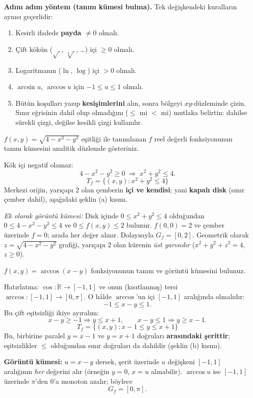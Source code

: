 \textbf{Adım adım yöntem (tanım kümesi bulma).} Tek değişkendeki kuralların aynısı geçerlidir:
\begin{enumerate}
  \item Kesirli ifadede \textbf{payda $\neq 0$} olmalı.
  \item Çift kökün ($\sqrt{\ }$, $\sqrt[4]{\ }$, \dots) içi \textbf{$\ge 0$} olmalı.
  \item Logaritmanın ($\ln$, $\log$) içi \textbf{$>0$} olmalı.
  \item $\arcsin u$, $\arccos u$ için \textbf{$-1\le u\le 1$} olmalı.
  \item Bütün koşulları yazıp \textbf{kesişimlerini} alın, sonra bölgeyi $xy$-düzleminde çizin. Sınır eğrisinin dahil olup
        olmadığını ($\le$ mi $<$ mi) mutlaka belirtin: dahilse sürekli çizgi, değilse kesikli çizgi kullanılır.
\end{enumerate}

\begin{soru}
$f(x,y)=\sqrt{4-x^2-y^2}$ eşitliği ile tanımlanan $f$ reel değerli fonksiyonunun tanım kümesini analitik düzlemde
gösteriniz.
\end{soru}
\begin{cevap}
Kök içi negatif olamaz:
\[
4-x^2-y^2\ge 0 \;\Longrightarrow\; x^2+y^2\le 4 .
\]
\[
T_f=\{(x,y): x^2+y^2\le 4\}
\]
Merkezi orijin, yarıçapı $2$ olan çemberin \textbf{içi ve kendisi}; yani \textbf{kapalı disk} (sınır çember dahil),
aşağıdaki şeklin (a) kısmı.

\emph{Ek olarak görüntü kümesi:} Disk içinde $0\le x^2+y^2\le 4$ olduğundan $0\le 4-x^2-y^2\le 4$ ve
$0\le f(x,y)\le 2$ bulunur. $f(0,0)=2$ ve çember üzerinde $f=0$; arada her değer alınır. Dolayısıyla $G_f=[0,2]$.
Geometrik olarak $z=\sqrt{4-x^2-y^2}$ grafiği, yarıçapı $2$ olan kürenin \emph{üst yarısıdır} ($x^2+y^2+z^2=4$, $z\ge 0$).
\end{cevap}

\begin{soru}
$f(x,y)=\arccos(x-y)$ fonksiyonunun tanım ve görüntü kümesini bulunuz.
\end{soru}
\begin{cevap}
Hatırlatma: $\cos:\mathbb R\to[-1,1]$ ve onun (kısıtlanmış) tersi $\arccos:[-1,1]\to[0,\pi]$. O hâlde $\arccos$'un içi
$[-1,1]$ aralığında olmalıdır:
\[
-1\le x-y\le 1 .
\]
Bu çift eşitsizliği ikiye ayıralım:
\[
x-y\ge -1 \Rightarrow y\le x+1, \qquad x-y\le 1 \Rightarrow y\ge x-1 .
\]
\[
T_f=\{(x,y): x-1\le y\le x+1\}
\]
Bu, birbirine paralel $y=x-1$ ve $y=x+1$ doğruları \textbf{arasındaki şerittir}; eşitsizlikler $\le$ olduğundan sınır
doğruları da dahildir (şeklin (b) kısmı).

\textbf{Görüntü kümesi:} $u=x-y$ dersek, şerit üzerinde $u$ değişkeni $[-1,1]$ aralığının \emph{her} değerini alır
(örneğin $y=0$, $x=u$ alınabilir). $\arccos u$ ise $[-1,1]$ üzerinde $\pi$'den $0$'a monoton azalır; böylece
\[
G_f=[0,\pi].
\]
\end{cevap}

